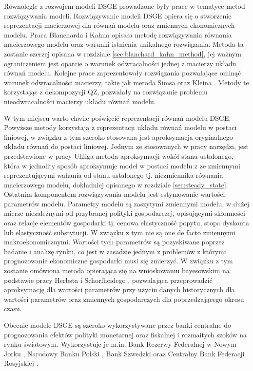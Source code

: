 Równolegle z rozwojem modeli DSGE prowadzone były prace w tematyce metod rozwiązywania modeli. Rozwiązywanie modeli DSGE opiera się o stworzenie reprezentacji macierzowej dla równań modelu oraz zmiennych ekonomicznych modelu. Praca Blancharda i Kahna \cite{10.2307/1912186} opisała metodę rozwiązywania równania macierzowego modelu oraz warunki istnienia unikalnego rozwiązania. Metoda ta zostanie szerzej opisana w rozdziale \ref{sec:blanchard_kahn_method}, jej ważnym ograniczeniem jest oparcie o warunek odwracalności jednej z macierzy układu równań modelu. Kolejne prace zaprezentowały rozwiązania pozwalające ominąć warunek odwracalności macierzy, takie jak metoda Simsa \cite{sims} oraz Kleina \cite{KLEIN20001405}. Metody te korzystając z dekompozycji QZ, pozwalały na rozwiązanie problemu nieodwracalności macierzy układu równań modelu. 

W tym miejscu warto chwile poświęcić reprezentacji równań modelu DSGE. Powyższe metody korzystają z reprezentacji układu równań modelu w postaci liniowej, w związku z tym szeroko stosowana jest aproksymacja oryginalnego układu równań do postaci liniowej. Jednym ze stosowanych w pracy narzędzi, jest przedstawione w pracy Uhliga\cite{uhlig:1995} metoda aproksymacji wokół stanu ustalonego, która w jednolity sposób aproksymuje model w postaci modelu z ze zmiennymi reprezentującymi wahania od stanu ustalonego tj. niezmiennika równania macierzowego modelu, dokładniej opisanego w rozdziale \ref{sec:steady_state}. Ostatnim komponentem rozwiązywania modelu jest estymowanie wartości parametrów modelu. Parametry modelu są zaszytymi zmiennymi modelu, w dużej mierze niezależnymi od przybranej polityki gospodarczej, opisującymi skłonności oraz relacje elementów gospodarki tj. cenowa elastyczność popytu, stopa dyskonta lub elastyczność substytucji. W związku z tym nie są one de facto zmiennymi makroekonomicznymi. Wartości tych parametrów są pozyskiwane poprzez badanie i analizę rynku, co jest w zasadzie jednym z problemów z którymi prognozowanie ekonomiczne gospodarki musi się zmierzyć. W związku z tym zostanie omówiona metoda opierająca się na wnioskowaniu bayesowskim na podstawie pracy Herbsta i Schorfheidego \cite{herbst}, pozwalająca przeprowadzić aproksymację dla wartości parametrów przy użyciu danych historycznych dla wartości parametrów oraz zmiennych gospodarczych dla poprzedzającego okresu czasu.

Obecnie modele DSGE są szeroko wykorzystywane przez banki centralne do prognozowania efektów polityki monetarnej oraz fiskalnej i rozmaitych szoków na rynku światowym. Wykorzystuje je m.in. Bank Rezerwy Federalnej w Nowym Jorku \cite{del2013frbny}, Narodowy Banku Polski \cite{nbpKoloch}, Bank Szwedzki  \cite{dsgeSweden} oraz Centralny Bank Federacji Rosyjskiej \cite{dsgeRussia}.

